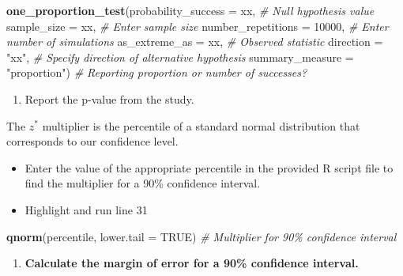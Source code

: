 \documentclass[
]{report}
\newenvironment{Shaded}{\begin{snugshade}}{\end{snugshade}}
\newcommand{\AttributeTok}[1]{\textcolor[rgb]{0.13,0.29,0.53}{#1}}
\newcommand{\CommentTok}[1]{\textcolor[rgb]{0.56,0.35,0.01}{\textit{#1}}}
\newcommand{\ConstantTok}[1]{\textcolor[rgb]{0.56,0.35,0.01}{#1}}
\newcommand{\DecValTok}[1]{\textcolor[rgb]{0.00,0.00,0.81}{#1}}
\newcommand{\FunctionTok}[1]{\textcolor[rgb]{0.13,0.29,0.53}{\textbf{#1}}}
\newcommand{\NormalTok}[1]{#1}
\newcommand{\StringTok}[1]{\textcolor[rgb]{0.31,0.60,0.02}{#1}}
\providecommand{\tightlist}{%
  \setlength{\itemsep}{0pt}\setlength{\parskip}{0pt}}
\begin{document}
\begin{Shaded}
\begin{Highlighting}[]
\FunctionTok{one\_proportion\_test}\NormalTok{(}\AttributeTok{probability\_success =}\NormalTok{ xx, }\CommentTok{\# Null hypothesis value}
          \AttributeTok{sample\_size =}\NormalTok{ xx, }\CommentTok{\# Enter sample size}
          \AttributeTok{number\_repetitions =} \DecValTok{10000}\NormalTok{, }\CommentTok{\# Enter number of simulations}
          \AttributeTok{as\_extreme\_as =}\NormalTok{ xx, }\CommentTok{\# Observed statistic}
          \AttributeTok{direction =} \StringTok{"xx"}\NormalTok{, }\CommentTok{\# Specify direction of alternative hypothesis}
          \AttributeTok{summary\_measure =} \StringTok{"proportion"}\NormalTok{) }\CommentTok{\# Reporting proportion or number of successes?}
\end{Highlighting}
\end{Shaded}

\begin{enumerate}
\def\labelenumi{\arabic{enumi}.}
\setcounter{enumi}{5}
\tightlist
\item
  Report the p-value from the study.
\end{enumerate}

\vspace{0.2in}

The \(z^*\) multiplier is the percentile of a standard normal distribution that corresponds to our confidence level.

\begin{itemize}
\item
  Enter the value of the appropriate percentile in the provided R script file to find the multiplier for a 90\% confidence interval.
\item
  Highlight and run line 31
\end{itemize}

\begin{Shaded}
\begin{Highlighting}[]
\FunctionTok{qnorm}\NormalTok{(percentile, }\AttributeTok{lower.tail =} \ConstantTok{TRUE}\NormalTok{) }\CommentTok{\# Multiplier for 90\% confidence interval}
\end{Highlighting}
\end{Shaded}

\begin{enumerate}
\def\labelenumi{\arabic{enumi}.}
\setcounter{enumi}{6}
\tightlist
\item
  \textbf{Calculate the margin of error for a 90\% confidence interval.}
\end{enumerate}
\end{document}
